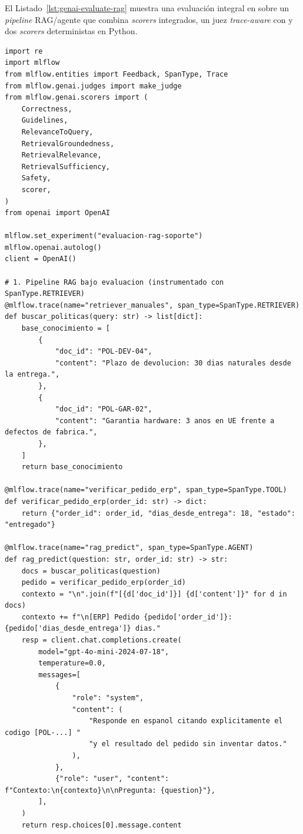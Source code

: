 El Listado~\ref{lst:genai-evaluate-rag} muestra una evaluación integral en  sobre un \textit{pipeline} RAG/agente que combina \textit{scorers} integrados, un juez \textit{trace-aware} con  y dos \textit{scorers} deterministas en Python.

\begin{lstlisting}[style=python, caption={Evaluación integral de un sistema RAG/Agente con \code{mlflow.genai.evaluate}, scorers integrados, juez \textit{trace-aware} (\code{make\_judge}) y scorers deterministas (\code{@scorer}).}, label={lst:genai-evaluate-rag}]
import re
import mlflow
from mlflow.entities import Feedback, SpanType, Trace
from mlflow.genai.judges import make_judge
from mlflow.genai.scorers import (
    Correctness,
    Guidelines,
    RelevanceToQuery,
    RetrievalGroundedness,
    RetrievalRelevance,
    RetrievalSufficiency,
    Safety,
    scorer,
)
from openai import OpenAI

mlflow.set_experiment("evaluacion-rag-soporte")
mlflow.openai.autolog()
client = OpenAI()

# 1. Pipeline RAG bajo evaluacion (instrumentado con SpanType.RETRIEVER)
@mlflow.trace(name="retriever_manuales", span_type=SpanType.RETRIEVER)
def buscar_politicas(query: str) -> list[dict]:
    base_conocimiento = [
        {
            "doc_id": "POL-DEV-04",
            "content": "Plazo de devolucion: 30 dias naturales desde la entrega.",
        },
        {
            "doc_id": "POL-GAR-02",
            "content": "Garantia hardware: 3 anos en UE frente a defectos de fabrica.",
        },
    ]
    return base_conocimiento

@mlflow.trace(name="verificar_pedido_erp", span_type=SpanType.TOOL)
def verificar_pedido_erp(order_id: str) -> dict:
    return {"order_id": order_id, "dias_desde_entrega": 18, "estado": "entregado"}

@mlflow.trace(name="rag_predict", span_type=SpanType.AGENT)
def rag_predict(question: str, order_id: str) -> str:
    docs = buscar_politicas(question)
    pedido = verificar_pedido_erp(order_id)
    contexto = "\n".join(f"[{d['doc_id']}] {d['content']}" for d in docs)
    contexto += f"\n[ERP] Pedido {pedido['order_id']}: {pedido['dias_desde_entrega']} dias."
    resp = client.chat.completions.create(
        model="gpt-4o-mini-2024-07-18",
        temperature=0.0,
        messages=[
            {
                "role": "system",
                "content": (
                    "Responde en espanol citando explicitamente el codigo [POL-...] "
                    "y el resultado del pedido sin inventar datos."
                ),
            },
            {"role": "user", "content": f"Contexto:\n{contexto}\n\nPregunta: {question}"},
        ],
    )
    return resp.choices[0].message.content


\end{lstlisting}
